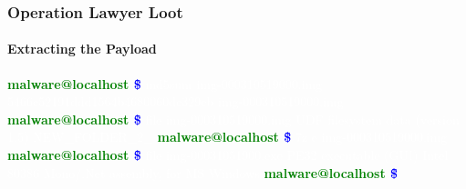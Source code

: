 \documentclass[aspectratio=169]{beamer}
\begin{document}
{
\begin{frame}
  \frametitle{Operation Lawyer Loot}
  \framesubtitle{Extracting the Payload}
  \begin{center}
    \begin{tcolorbox}[title=terminal,colback=black]
      \begin{minipage}{0.8\textwidth}
        \textbf{\textcolor{green}{malware@localhost \textcolor{blue}{\~ \$}}}
        \textcolor{white}{md5sum img-000310519000.img}
        \newline
        \textcolor{white}{5466c52191ddd1564b4680060dc329cb  img-000310519000.img}
        \newline
        \textbf{\textcolor{green}{malware@localhost \textcolor{blue}{\~ \$}}}
        \textcolor{white}{ file img-000310519000.img}
        \newline
        \textcolor{white}{UDF filesystem data (version 1.5) NEW\_FOLDER\_2\_}
        \newline
        \textbf{\textcolor{green}{malware@localhost \textcolor{blue}{\~ \$}}}
        \textcolor{white}{ 7z e img-000310519000.img}
        \newline
        \textbf{\textcolor{green}{malware@localhost \textcolor{blue}{\~ \$}}}
        \textcolor{white}{ file img-00031051900.exe}
        \newline
        \textcolor{white}{PE32 executable (GUI) Intel 80386 Mono/.Net assembly, for MS Windows}
        \newline
        \textbf{\textcolor{green}{malware@localhost \textcolor{blue}{\~ \$}}}
      \end{minipage}
    \end{tcolorbox}
  \end{center}
\end{frame}
}
\end{document}
